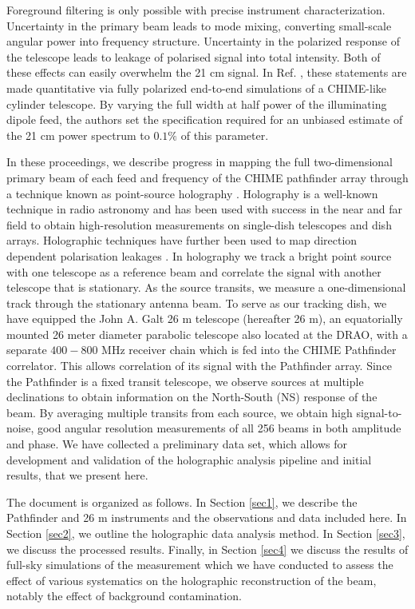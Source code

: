 Foreground filtering is only possible with precise instrument characterization. Uncertainty in the primary beam leads to mode mixing, converting small-scale angular power into frequency structure. Uncertainty in the polarized response of the telescope leads to leakage of polarised signal into total intensity. Both of these effects can easily overwhelm the 21 cm signal. In Ref. \citep{mmodes2}, these statements are made quantitative via fully polarized end-to-end simulations of a CHIME-like cylinder telescope. By varying the full width at half power of the illuminating dipole feed, the authors set the specification required for an unbiased estimate of the 21 cm power spectrum to $0.1\%$ of this parameter.

In these proceedings, we describe progress in mapping the full two-dimensional primary beam of each feed and frequency of the CHIME pathfinder array through a technique known as point-source holography \citep{radio1, radio2}. Holography is a well-known technique in radio astronomy and has been used with success in the near \citep{hol1} and far field \citep{hol2} to obtain high-resolution measurements on single-dish telescopes and dish arrays. Holographic techniques have further been used to map direction dependent polarisation leakages \citep{holpol}. In holography we track a bright point source with one telescope as a reference beam and correlate the signal with another telescope that is stationary. As the source transits, we measure a one-dimensional track through the stationary antenna beam. To serve as our tracking dish, we have equipped the John A. Galt 26 m telescope\citep{wolleben1, wolleben2} (hereafter 26 m), an equatorially mounted 26 meter diameter parabolic telescope also located at the DRAO, with a separate $400-800$ MHz receiver chain which is fed into the CHIME Pathfinder correlator. This allows correlation of its signal with the Pathfinder array. Since the Pathfinder is a fixed transit telescope, we observe sources at multiple declinations to obtain information on the North-South (NS) response of the beam. By averaging multiple transits from each source, we obtain high signal-to-noise, good angular resolution measurements of all 256 beams in both amplitude and phase. We have collected a preliminary data set, which allows for development and validation of the holographic analysis pipeline and initial results, that we present here.

The document is organized as follows. In Section \ref{sec1}, we describe the Pathfinder and 26 m instruments and the observations and data included here. In Section \ref{sec2}, we outline the holographic data analysis method. In Section \ref{sec3}, we discuss the processed results. Finally, in Section \ref{sec4} we discuss the results of full-sky simulations of the measurement which we have conducted to assess the effect of various systematics on the holographic reconstruction of the beam, notably the effect of background contamination.


